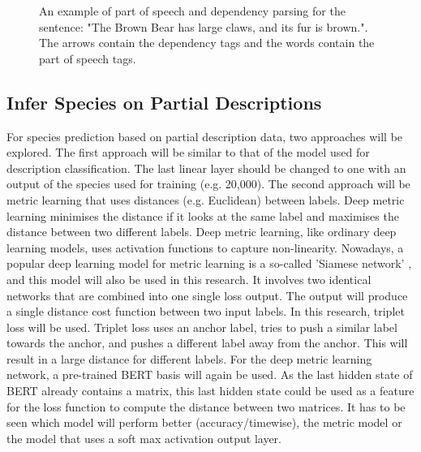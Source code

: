 \documentclass{article}
\begin{document}
\begin{figure} [t]
    \centering
    \vspace{-2.0cm}
    \makebox[\textwidth][c]{}
    \caption{An example of part of speech and dependency parsing for the sentence: "The Brown Bear has large claws, and its fur is brown.". The arrows contain the dependency tags and the words contain the part of speech tags.}
    \label{fig:PoS_example}
\end{figure}

\subsection{Infer Species on Partial Descriptions}
For species prediction based on partial description data, two approaches will be explored.
The first approach will be similar to that of the model used for description classification.
The last linear layer should be changed to one with an output of the species used for training (e.g. 20,000).
The second approach will be metric learning that uses distances (e.g. Euclidean) between labels.
Deep metric learning minimises the distance if it looks at the same label and maximises the distance between two different labels.
Deep metric learning, like ordinary deep learning models, uses activation functions to capture non-linearity.
Nowadays, a popular deep learning model for metric learning is a so-called 'Siamese network' \autocite{kaya_deep_2019}, and this model will also be used in this research.
It involves two identical networks that are combined into one single loss output.
The output will produce a single distance cost function between two input labels.
In this research, triplet loss \autocite{schroff_facenet_2015} will be used.
Triplet loss uses an anchor label, tries to push a similar label towards the anchor, and pushes a different label away from the anchor.
This will result in a large distance for different labels.
For the deep metric learning network, a pre-trained BERT basis will again be used.
As the last hidden state of BERT already contains a matrix, this last hidden state could be used as a feature for the loss function to compute the distance between two matrices.
It has to be seen which model will perform better (accuracy/timewise), the metric model or the model that uses a soft max activation output layer. 
\end{document}
